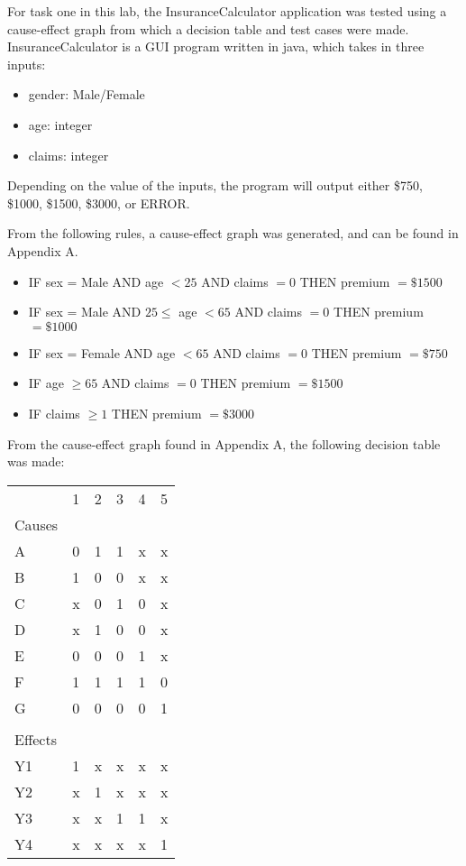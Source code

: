 For task one in this lab, the InsuranceCalculator application was tested using
a cause-effect graph from which a decision table and test cases were made.
InsuranceCalculator is a GUI program
written in java, which takes in three inputs:
\begin{itemize}
	\item gender: Male/Female
	\item age: integer
	\item claims: integer
\end{itemize}
Depending on the value of the inputs, the program will output either \$750,
\$1000, \$1500, \$3000, or ERROR.

From the following rules, a cause-effect graph was generated, and can be found
in Appendix A.
\begin{itemize}
	\item IF sex = Male AND age $<25$ AND claims $=0$ THEN premium $=\$1500$
	\item IF sex = Male AND $25\leq$ age $<65$ AND claims $=0$ THEN premium
	      $=\$1000$

	\item IF sex = Female AND age $<65$ AND claims $=0$ THEN premium
	      $=\$750$
	\item IF age $\geq 65$ AND claims $=0$ THEN premium $=\$1500$
	\item IF claims $\geq 1$ THEN premium $=\$3000$
\end{itemize}

From the cause-effect graph found in Appendix A, the following decision table
was made:
\vspace{20pt}

\begin{adjustbox}{center}
	\begin{tabular}{llllll}
		        & 1 & 2 & 3 & 4 & 5 \\ %
		Causes  &   &   &   &   &   \\ \cline{1-1}
		A       & 0 & 1 & 1 & x & x \\
		B       & 1 & 0 & 0 & x & x \\
		C       & x & 0 & 1 & 0 & x \\
		D       & x & 1 & 0 & 0 & x \\
		E       & 0 & 0 & 0 & 1 & x \\
		F       & 1 & 1 & 1 & 1 & 0 \\
		G       & 0 & 0 & 0 & 0 & 1 \\
		        &   &   &   &   &   \\
		Effects &   &   &   &   &   \\ \cline{1-1}
		Y1      & 1 & x & x & x & x \\
		Y2      & x & 1 & x & x & x \\
		Y3      & x & x & 1 & 1 & x \\
		Y4      & x & x & x & x & 1
	\end{tabular}%
\end{adjustbox}

